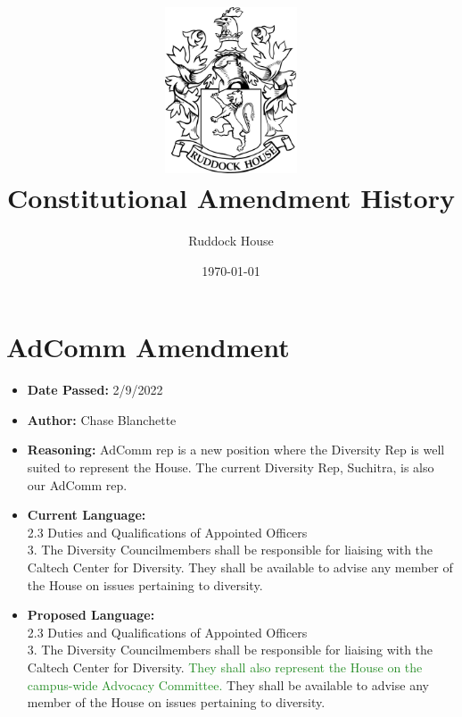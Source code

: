 \documentclass[10pt]{article} %
\title{\includegraphics[width=1.55in]{ruddock_crest.png} \\ Constitutional Amendment History}
\author{Ruddock House}
\date{\today} %
\begin{document}
\maketitle

\section{AdComm Amendment}
\begin{itemize}
	\item \textbf{Date Passed:} 2/9/2022
	\item \textbf{Author:} Chase Blanchette
	\item \textbf{Reasoning:} AdComm rep is a new position where the Diversity Rep is well suited to represent the House. The current Diversity Rep, Suchitra, is also our AdComm rep.
	\item \textbf{Current Language:} \\
	2.3 Duties and Qualifications of Appointed Officers \\
	3. The Diversity Councilmembers shall be responsible for liaising with the Caltech Center for Diversity. They shall be available to advise any member of the House on issues pertaining to diversity. 
	\item \textbf{Proposed Language:} \\
	2.3 Duties and Qualifications of Appointed Officers \\
	3. The Diversity Councilmembers shall be responsible for liaising with the Caltech Center for Diversity. \textcolor{ForestGreen}{They shall also represent the House on the campus-wide Advocacy Committee. }They shall be available to advise any member of the House on issues pertaining to diversity. 
\end{itemize}
\end{document}
